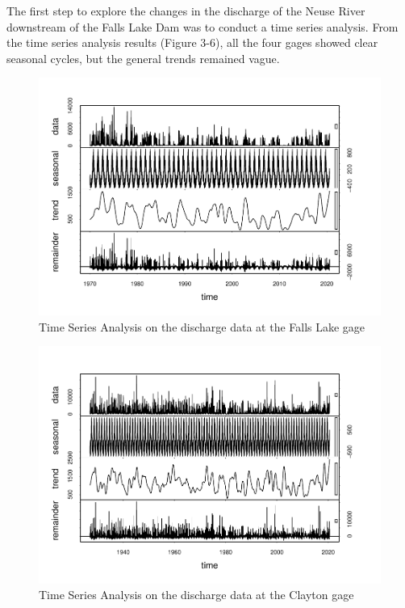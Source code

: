 \documentclass[
  12pt,
]{article}
\begin{document}
The first step to explore the changes in the discharge of the Neuse
River downstream of the Falls Lake Dam was to conduct a time series
analysis. From the time series analysis results (Figure 3-6), all the
four gages showed clear seasonal cycles, but the general trends remained
vague.

\begin{figure}

\includegraphics{Gardner_Zeng_pdf_output_files/figure-latex/Time series Falls Lake-1} \hfill{}

\caption{Time Series Analysis on the discharge data at the Falls Lake gage}\label{fig:Time series Falls Lake}
\end{figure}

\begin{figure}

\includegraphics{Gardner_Zeng_pdf_output_files/figure-latex/Time series Clayton-1} \hfill{}

\caption{Time Series Analysis on the discharge data at the Clayton gage}\label{fig:Time series Clayton}
\end{figure}
\end{document}
